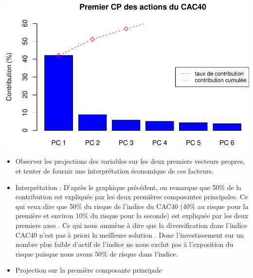 \documentclass[
]{article}
\newenvironment{Shaded}{\begin{snugshade}}{\end{snugshade}}
\newcommand{\AttributeTok}[1]{\textcolor[rgb]{0.77,0.63,0.00}{#1}}
\newcommand{\DecValTok}[1]{\textcolor[rgb]{0.00,0.00,0.81}{#1}}
\newcommand{\FloatTok}[1]{\textcolor[rgb]{0.00,0.00,0.81}{#1}}
\newcommand{\FunctionTok}[1]{\textcolor[rgb]{0.00,0.00,0.00}{#1}}
\newcommand{\NormalTok}[1]{#1}
\newcommand{\OtherTok}[1]{\textcolor[rgb]{0.56,0.35,0.01}{#1}}
\newcommand{\SpecialCharTok}[1]{\textcolor[rgb]{0.00,0.00,0.00}{#1}}
\newcommand{\StringTok}[1]{\textcolor[rgb]{0.31,0.60,0.02}{#1}}
\begin{document}
\includegraphics{TP-1_files/figure-latex/PCA-1.pdf}

\begin{itemize}
\item
  Observer les projections des variables sur les deux premiers vecteurs
  propres, et tenter de fournir une interprétation économique de ces
  facteurs.
\item
  Interprétation : D'après le graphique précédent, on remarque que 50\%
  de la contribution est expliquée par les deux premières composantes
  principales. Ce qui veux dire que 50\% du risque de l'indice du CAC40
  (40\% au risque pour la première et environ 10\% du risque pour la
  seconde) est expliquée par les deux premiers axes . Ce qui nous ammène
  à dire que la diversification dans l'indice CAC40 n'est pas à priori
  la meilleure solution . Donc l'investissement sur un nombre plus
  faible d'actif de l'indice ne nous exclut pas à l'exposition du risque
  puisque nous avons 50\% de risque dans l'indice.
\item
  Projection sur la première composante principale
\end{itemize}

\begin{Shaded}
\end{Shaded}
\end{document}
